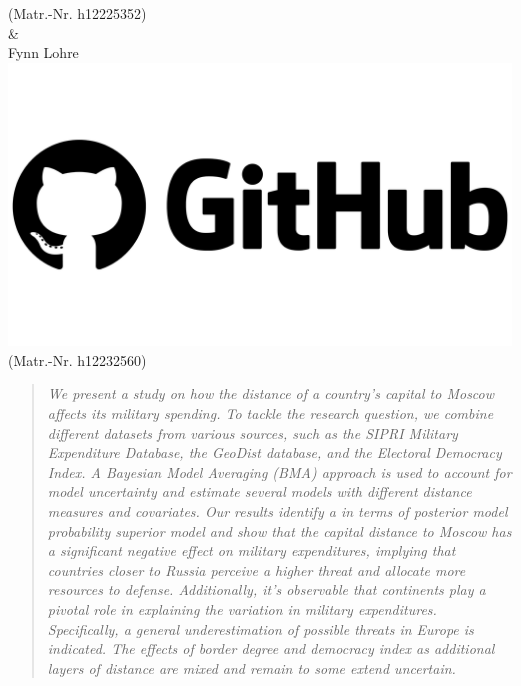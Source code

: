 \documentclass[12pt,a4paper]{article}
\begin{document}
\begin{titlepage}
(Matr.-Nr. h12225352)\\ \vspace{3mm}
\& \\ \vspace{3mm}
{\Large Fynn Lohre \href{https://github.com/VARFynn}{\includegraphics[scale=0.01]{GitHub.png}}}\\
(Matr.-Nr. h12232560)\
\vfill

\thispagestyle{empty}
\pagebreak
\end{titlepage}
\thispagestyle{empty}
\begin{abstract}
\textit{We present a study on how the distance of a country’s capital to Moscow affects its military spending. To tackle the research question, we combine different datasets from various sources, such as the SIPRI Military Expenditure Database, the GeoDist database, and the Electoral Democracy Index. A Bayesian Model Averaging (BMA) approach is used to account for model uncertainty and estimate several models with different distance measures and covariates. Our results identify a in terms of posterior model probability superior model and show that the capital distance to Moscow has a significant negative effect on military expenditures, implying that countries closer to Russia perceive a higher threat and allocate more resources to defense. Additionally, it's observable that continents play a pivotal role in explaining the variation in military expenditures. Specifically, a general underestimation of possible threats in Europe is indicated. The effects of border degree and democracy index as additional layers of distance are mixed and remain to some extend uncertain.} 
\end{abstract}
\clearpage
\thispagestyle{plain}
\tableofcontents
\pagebreak
{}
\end{document}
